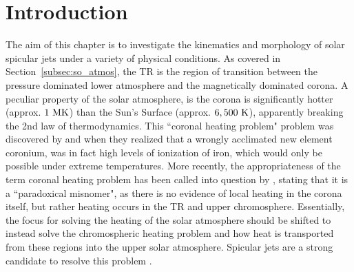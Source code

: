 \documentclass[12pt]{ociamthesis}
\newcommand{\np}{\\ \\}
\begin{document}
\section{Introduction}
\label{sec:c2intro}
The aim of this chapter is to investigate the kinematics and morphology of solar spicular jets under a variety of physical conditions. As covered in Section~\ref{subsec:so_atmos}, the TR is the region of transition between the pressure dominated lower atmosphere and the magnetically dominated corona. A peculiar property of the solar atmosphere, is the corona is significantly hotter (approx. $1~\rm{MK}$) than the Sun's Surface (approx. $6,500~\rm{K}$), apparently breaking the 2nd law of thermodynamics. This ``coronal heating problem" problem was discovered by \cite{Grotrian1939} and \cite{Edl1943} when they realized that a wrongly acclimated new element coronium, was in fact high levels of ionization of iron, which would only be possible under extreme temperatures. More recently, the appropriateness of the term coronal heating problem has been called into question by \cite{Aschwanden2007ApJ}, stating that it is a ``paradoxical misnomer", as there is no evidence of local heating in the corona itself, but rather heating occurs in the TR and upper chromosphere. Essentially, the focus for solving the heating of the solar atmosphere should be shifted to instead solve the chromospheric heating problem and how heat is transported from these regions into the upper solar atmosphere. Spicular jets are a strong candidate to resolve this problem \citep{Kudoh1999ApJ514493K, Pontieu2007PASJ, Martinez-Sykora2017,Moore2011ApJ731L18M, Pontieu2017ApJ, Samanta2019Sci, Zuo2019AcASn, Bale2019Natur}.\np
%
\end{document}
